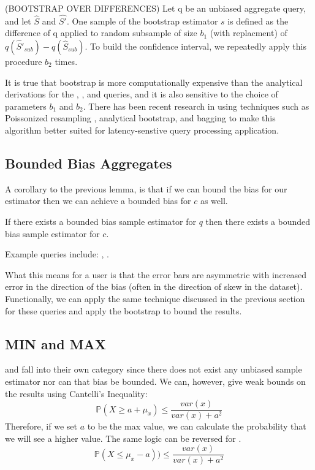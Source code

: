 \begin{proposition} (BOOTSTRAP OVER DIFFERENCES) Let q be an unbiased aggregate query, and let $\hat{S}$ and $\hat{S'}$.
One sample of the bootstrap estimator $s$ is defined as the difference of q applied to random subsample of size $b_1$ (with replacment) of $q(\hat{S'}_{sub}) - q(\hat{S}_{sub})$. 
To build the confidence interval, we repeatedly apply this procedure $b_2$ times.
\end{proposition}

It is true that bootstrap is more computationally expensive than the analytical derivations for the \sumfunc, \countfunc, and \avgfunc queries, and it is also sensitive to the choice of parameters $b_1$ and $b_2$.
There has been recent research in using techniques such as Poissonized resampling \cite{agarwalknowing}, analytical bootstrap\cite{DBLP:conf/sigmod/ZengGMZ14}, and bagging \cite{DBLP:conf/kdd/KleinerTASJ13} to make this algorithm better suited for latency-senstive query processing application.

\subsection{Bounded Bias Aggregates}
A corollary to the previous lemma, is that if we can bound the bias for our estimator then we can achieve a bounded bias for $c$ as well.
\begin{corollary}
If there exists a bounded bias sample estimator for $q$ then there exists a bounded bias sample estimator for $c$.
\end{corollary}
Example queries include: \medfunc, \percfunc.

What this means for a user is that the error bars are asymmetric with increased error in the direction of the bias (often in the direction of skew in the dataset).
Functionally, we can apply the same technique discussed in the previous section for these queries and apply the bootstrap to bound the results. 

\subsection{MIN and MAX}
\minfunc and \maxfunc fall into their own category since there does not exist any unbiased sample estimator nor can that bias be bounded.
We can, however, give weak bounds on the results using Cantelli's Inequality:
\[
\mathbb{P}(X \ge a + \mu_x ) \le \frac{var(x)}{var(x) + a^2}
\]
Therefore, if we set $a$ to be the max value, we can calculate the probability that we will see a higher value. The same logic can be reversed for \minfunc.
\[
\mathbb{P}(X \le \mu_x - a )) \le \frac{var(x)}{var(x) + a^2}
\]

